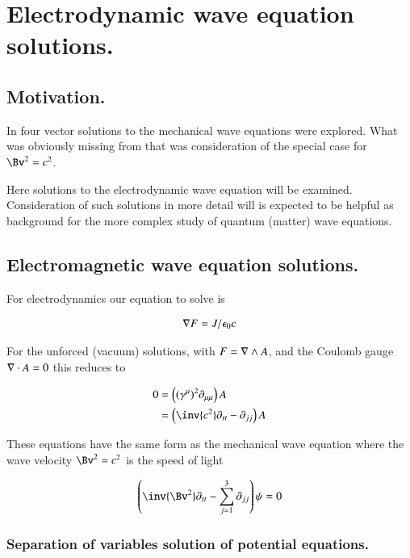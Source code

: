 \chapter{Electrodynamic wave equation solutions.}\label{chap:PJemWave}
\date{Jan 25, 2009.  emWave.tex}

\section{Motivation. }

In  four vector solutions to the mechanical wave
equations were explored.  What was obviously missing from that 
was consideration of the special case for $\Bv^2 = c^2$.

Here solutions to the electrodynamic wave equation will be examined.
Consideration of such solutions in more detail will is expected
to be helpful 
as background for the more complex study of quantum (matter) wave equations.

\section{Electromagnetic wave equation solutions. }

For electrodynamics our equation to solve is

\begin{align}
\nabla F = J/\epsilon_0 c
\end{align}

For the unforced (vacuum) solutions, with 
$F = \nabla \wedge A$, and the Coulomb gauge $\nabla \cdot A = 0$ this 
reduces to

\begin{align*}
0 
&= \left((\gamma^\mu)^2 \partial_{\mu\mu}\right) A  \\
&= \left( \inv{c^2}\partial_{tt} -\partial_{jj} \right) A
\end{align*}

These equations have the same form as the mechanical wave equation
where the wave velocity $\Bv^2 = c^2$ is the speed of light

\begin{align}\label{eqn:em_wave:waveEquation}
\left( \inv{\Bv^2} \partial_{tt} - \sum_{j=1}^3 \partial_{jj}\right) \psi = 0
\end{align}

\subsection{Separation of variables solution of potential equations. }

